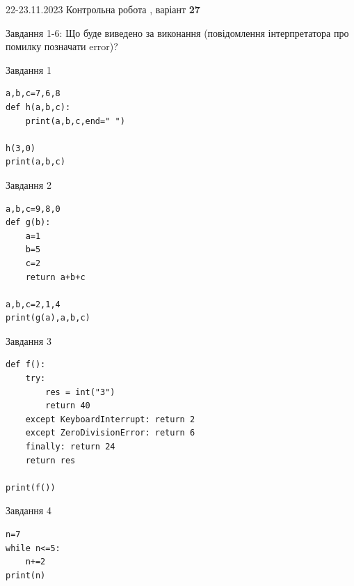 \documentclass[12pt, ukrainian]{article}
\begin{document}
{{22-23.11.2023 Контрольна робота , варіант  \No \textbf { 27 }\par}}
{

Завдання 1-6: Що буде виведено за виконання (повідомлення інтерпретатора про помилку позначати error)?


\begin{minipage}[t]{9.7cm}                
{\begin{center}Завдання {1}\end{center}}
\begin{verbatim}
a,b,c=7,6,8
def h(a,b,c):
    print(a,b,c,end=" ")

h(3,0)
print(a,b,c)
\end{verbatim}     
\end{minipage}
\vline \hspace{8mm}
\begin{minipage}[t]{8.0cm}                
{\begin{center}Завдання {2}\end{center}}
\begin{verbatim}
a,b,c=9,8,0
def g(b):
    a=1
    b=5
    c=2
    return a+b+c

a,b,c=2,1,4
print(g(a),a,b,c)
\end{verbatim}     
\end{minipage}

\vspace{15mm}
\begin{minipage}[t]{9.7cm}                
{\begin{center}Завдання {3}\end{center}}
\begin{verbatim}
def f():
    try:
        res = int("3")
        return 40
    except KeyboardInterrupt: return 2
    except ZeroDivisionError: return 6
    finally: return 24
    return res

print(f())
\end{verbatim}     
\end{minipage}
\vline \hspace{8mm}
\begin{minipage}[t]{8.0cm}                
{\begin{center}Завдання {4}\end{center}}
\begin{verbatim}
n=7
while n<=5:
    n+=2
print(n)
\end{verbatim}     
\end{minipage}

}
\end{document}
